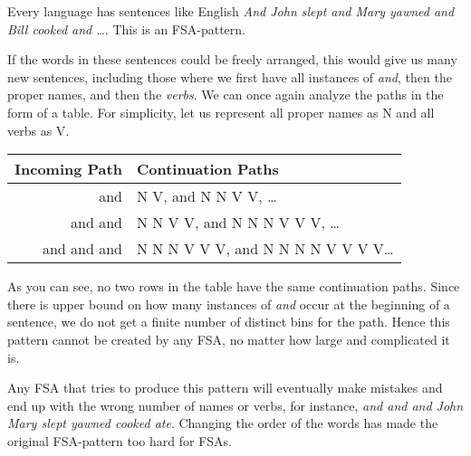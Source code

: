 \begin{examplebox}
    Every language has sentences like English \emph{And John slept and Mary yawned and Bill cooked and \ldots}.
    This is an FSA-pattern.

    If the words in these sentences could be freely arranged, this would give us many new sentences, including those where we first have all instances of \emph{and}, then the proper names, and then the \emph{verbs}.
    We can once again analyze the paths in the form of a table.
    For simplicity, let us represent all proper names as N and all verbs as V\@. 
    \begin{center}
        \begin{tabular}{rl}
            \toprule
            \textbf{Incoming Path} & \textbf{Continuation Paths}\\
            \midrule
            and & N V, and N N V V, \ldots\\
            and and & N N V V, and N N N V V V, \ldots\\
            and and and & N N N V V V, and N N N N V V V V\ldots
            \\
            \bottomrule
        \end{tabular}
    \end{center}
    As you can see, no two rows in the table have the same continuation paths.
    Since there is upper bound on how many instances of \emph{and} occur at the beginning of a sentence, we do not get a finite number of distinct bins for the path.
    Hence this pattern cannot be created by any FSA, no matter how large and complicated it is.
   
    Any FSA that tries to produce this pattern will eventually make mistakes and end up with the wrong number of names or verbs, for instance, \emph{and and and John Mary slept yawned cooked ate}.
    Changing the order of the words has made the original FSA-pattern too hard for FSAs.
\end{examplebox}

